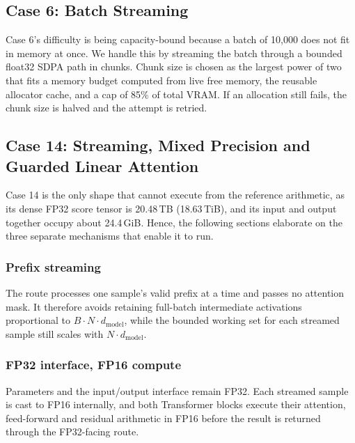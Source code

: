 \documentclass[10pt,conference,compsoc]{IEEEtran}
\begin{document}
\subsection{Case 6: Batch Streaming}
Case 6's difficulty is being capacity-bound because a batch of 10{,}000 does not fit in memory at once. We handle this by streaming the batch through a bounded float32 SDPA path in chunks. Chunk size is chosen as the largest power of two that fits a memory budget computed from live free memory, the reusable allocator cache, and a cap of 85\% of total VRAM. If an allocation still fails, the chunk size is halved and the attempt is retried.

\subsection{Case 14: Streaming, Mixed Precision and Guarded Linear Attention}
Case 14 is the only shape that cannot execute from the reference arithmetic, as its dense FP32 score tensor is 20.48\,TB (18.63\,TiB), and its input and output together occupy about 24.4\,GiB. Hence, the following sections elaborate on the three separate mechanisms that enable it to run.

\subsubsection{Prefix streaming}
The route processes one sample's valid prefix at a time and passes no attention mask. It therefore avoids retaining full-batch intermediate activations proportional to $B \cdot N \cdot d_\text{model}$, while the bounded working set for each streamed sample still scales with $N \cdot d_\text{model}$.

\subsubsection{FP32 interface, FP16 compute}
Parameters and the input/output interface remain FP32. Each streamed sample is cast to FP16 internally, and both Transformer blocks execute their attention, feed-forward and residual arithmetic in FP16 before the result is returned through the FP32-facing route.
\end{document}
